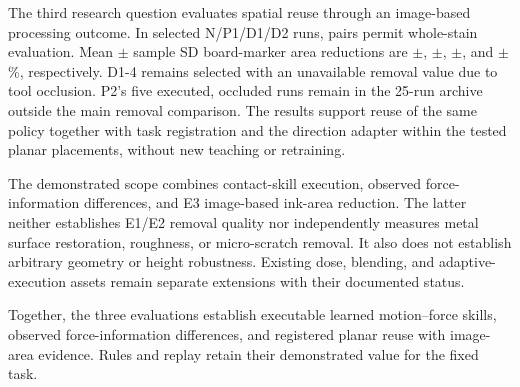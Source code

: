 The third research question evaluates spatial reuse through an image-based processing outcome. In \EthreeMainN{} selected N/P1/D1/D2 runs, \EthreeImageN{} pairs permit whole-stain evaluation. Mean \(\pm\) sample SD board-marker area reductions are \EthreeNRemoval\(\pm\)\EthreeNSD, \EthreePoneRemoval\(\pm\)\EthreePoneSD, \EthreeDoneRemoval\(\pm\)\EthreeDoneSD, and \EthreeDtwoRemoval\(\pm\)\EthreeDtwoSD\%, respectively. D1-4 remains selected with an unavailable removal value due to tool occlusion. P2's five executed, occluded runs remain in the 25-run archive outside the main removal comparison. The results support reuse of the same policy together with task registration and the direction adapter within the tested planar placements, without new teaching or retraining.

The demonstrated scope combines contact-skill execution, observed force-information differences, and E3 image-based ink-area reduction. The latter neither establishes E1/E2 removal quality nor independently measures metal surface restoration, roughness, or micro-scratch removal. It also does not establish arbitrary geometry or height robustness. Existing dose, blending, and adaptive-execution assets remain separate extensions with their documented status.

Together, the three evaluations establish executable learned motion--force skills, observed force-information differences, and registered planar reuse with image-area evidence. Rules and replay retain their demonstrated value for the fixed task.
